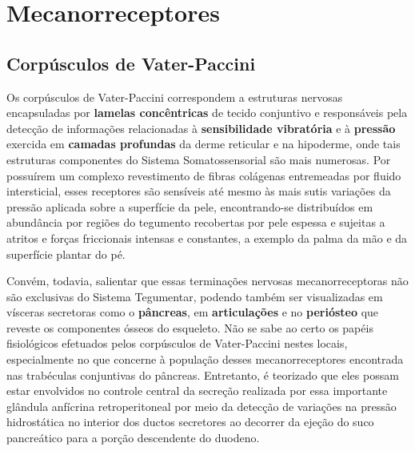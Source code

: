 \documentclass[
]{book}
\begin{document}
\hypertarget{mecanorreceptores}{%
\chapter{Mecanorreceptores}\label{mecanorreceptores}}

\hypertarget{corpuxfasculos-de-vater-paccini}{%
\section{Corpúsculos de Vater-Paccini}\label{corpuxfasculos-de-vater-paccini}}

Os corpúsculos de Vater-Paccini correspondem a estruturas nervosas encapsuladas por \textbf{lamelas concêntricas} de tecido conjuntivo e responsáveis pela detecção de informações relacionadas à \textbf{sensibilidade vibratória} e à \textbf{pressão} exercida em \textbf{camadas profundas} da derme reticular e na hipoderme, onde tais estruturas componentes do Sistema Somatossensorial são mais numerosas. Por possuírem um complexo revestimento de fibras colágenas entremeadas por fluido intersticial, esses receptores são sensíveis até mesmo às mais sutis variações da pressão aplicada sobre a superfície da pele, encontrando-se distribuídos em abundância por regiões do tegumento recobertas por pele espessa e sujeitas a atritos e forças friccionais intensas e constantes, a exemplo da palma da mão e da superfície plantar do pé.

Convém, todavia, salientar que essas terminações nervosas mecanorreceptoras não são exclusivas do Sistema Tegumentar, podendo também ser visualizadas em vísceras secretoras como o \textbf{pâncreas}, em \textbf{articulações} e no \textbf{periósteo} que reveste os componentes ósseos do esqueleto. Não se sabe ao certo os papéis fisiológicos efetuados pelos corpúsculos de Vater-Paccini nestes locais, especialmente no que concerne à população desses mecanorreceptores encontrada nas trabéculas conjuntivas do pâncreas. Entretanto, é teorizado que eles possam estar envolvidos no controle central da secreção realizada por essa importante glândula anfícrina retroperitoneal por meio da detecção de variações na pressão hidrostática no interior dos ductos secretores ao decorrer da ejeção do suco pancreático para a porção descendente do duodeno.
\end{document}
